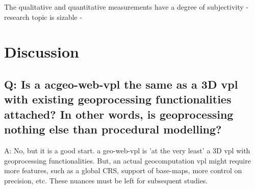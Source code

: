 The qualitative and quantitative measurements have a degree of subjectivity
- research topic is sizable
- 





\section{Discussion}
\label{sec:discussion}


\subsection{Q: Is a ac{geo-web-vpl} the same as a 3D vpl with existing geoprocessing functionalities attached? In other words, is geoprocessing nothing else than procedural modelling?}

A: No, but it is a good start. a geo-web-vpl is 'at the very least' a 3D vpl with geoprocessing functionalities. 
But, an actual geocomputation vpl might require more features, such as a global CRS, support of base-maps, more control on precision, etc. 
These nuances must be left for subsequent studies. 